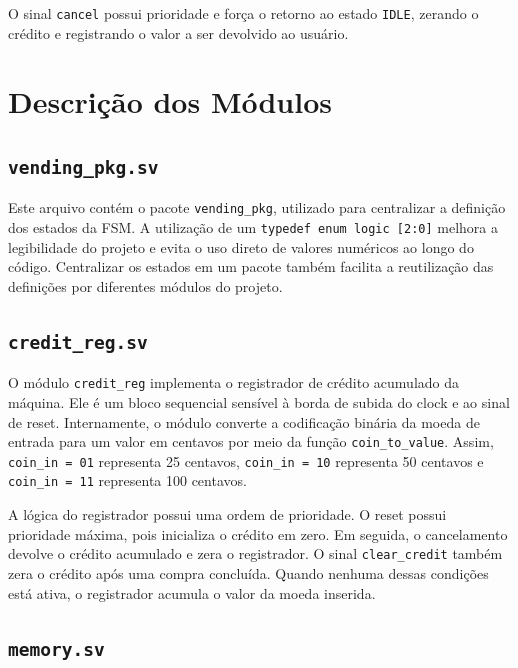 \documentclass[11pt,a4paper]{article}
\begin{document}
O sinal \texttt{cancel} possui prioridade e força o retorno ao estado \texttt{IDLE}, zerando o crédito e registrando o valor a ser devolvido ao usuário.

\section{Descrição dos Módulos}

\subsection{\texttt{vending\_pkg.sv}}

Este arquivo contém o pacote \texttt{vending\_pkg}, utilizado para centralizar a definição dos estados da FSM. A utilização de um \texttt{typedef enum logic [2:0]} melhora a legibilidade do projeto e evita o uso direto de valores numéricos ao longo do código. Centralizar os estados em um pacote também facilita a reutilização das definições por diferentes módulos do projeto.

\subsection{\texttt{credit\_reg.sv}}

O módulo \texttt{credit\_reg} implementa o registrador de crédito acumulado da máquina. Ele é um bloco sequencial sensível à borda de subida do clock e ao sinal de reset. Internamente, o módulo converte a codificação binária da moeda de entrada para um valor em centavos por meio da função \texttt{coin\_to\_value}. Assim, \texttt{coin\_in = 01} representa 25 centavos, \texttt{coin\_in = 10} representa 50 centavos e \texttt{coin\_in = 11} representa 100 centavos.

A lógica do registrador possui uma ordem de prioridade. O reset possui prioridade máxima, pois inicializa o crédito em zero. Em seguida, o cancelamento devolve o crédito acumulado e zera o registrador. O sinal \texttt{clear\_credit} também zera o crédito após uma compra concluída. Quando nenhuma dessas condições está ativa, o registrador acumula o valor da moeda inserida.

\subsection{\texttt{memory.sv}}
\end{document}
